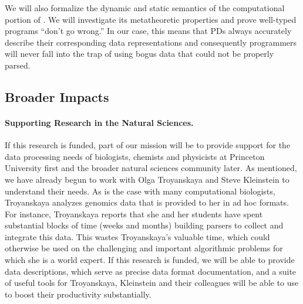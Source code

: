 \documentclass[11pt]{article}
\begin{document}
We will also formalize the dynamic and static semantics of the 
computational portion of \datatype.  We will investigate
its metatheoretic properties and prove well-typed programs 
``don't go wrong.''  In our case, this means that PDs always
accurately describe their corresponding data representations and
consequently programmers
will never fall into the trap of using bogus data that could not be 
properly parsed.


\subsection{Broader Impacts}
\label{sec:impact}

\paragraph*{Supporting Research in the Natural Sciences.}
If this research is funded, part of our mission will be
to provide support for the data processing needs of biologists,
chemists and physicists at Princeton University first and 
the broader natural sciences community later.  As mentioned,
we have already begun to work with Olga Troyanskaya
and Steve Kleinstein to understand their needs.
As is the case with many computational biologists,
Troyanskaya analyzes genomics data that is provided to her in ad hoc
formats.  For instance, Troyanskaya reports that she
and her students have spent
substantial blocks of time (weeks and months)
building parsers to collect and integrate
this data.  This wastes Troyanskaya's valuable time, which could otherwise be
used on the challenging and important algorithmic problems for which
she is a world expert.
If this research is
funded, we will be able to provide data descriptions, which serve as precise
data format
documentation, and a suite of useful tools for Troyanskaya, Kleinstein
and their colleagues will be able to use to boost their productivity
substantially.  

\end{document}
